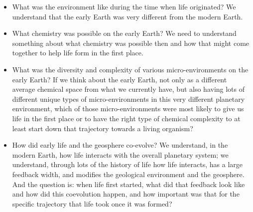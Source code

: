\documentclass[]{article}
\begin{document}
\begin{itemize}
	\item What was the environment like during the time when life originated?
	We understand that the early Earth was 	very different from the modern Earth.
	\item What chemistry was possible on the early Earth? We need to understand something about what chemistry was possible then and how that might come together to help 	life form in the first place.
	\item What was the diversity and complexity of various micro-environments on the early Earth? If we think about the early Earth, not only as a different average chemical space from what we currently have, but	also having lots of different unique types of micro-environments in this very different planetary environment, which of those micro-environments were most likely to give us life in the first place or to have the right type of chemical complexity 	to at least start down that trajectory towards a living organism?
	
	\item How did early life and the geosphere co-evolve? 
	We understand, in the modern Earth, how life interacts with the overall planetary	system; we understand, through lots of the history of life how life interacts, has a large feedback width, and modifies	the geological environment and the geosphere. And the question is: when life first started, what did	that feedback look like and how did this coevolution happen, and how important was that for the	specific trajectory that life took once it was formed?
\end{itemize}
\end{document}
